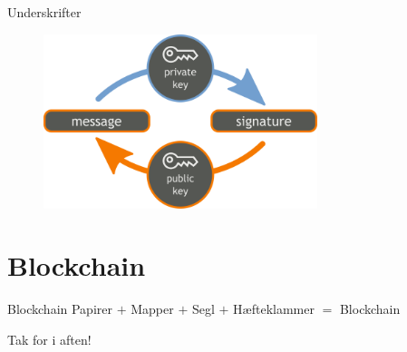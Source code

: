 \documentclass[usenames, dvipsnames]{beamer}
\begin{document}
  \begin{frame}{Underskrifter}
    \begin{figure}[ht!]
    \centering
    \includegraphics[width=80mm]{images/signature.png}
    \end{figure}
  \end{frame}
\section{Blockchain}
  \begin{frame}{Blockchain}
      \center Papirer $+$ Mapper $+$ Segl $+$ Hæfteklammer $=$ Blockchain
  \end{frame}
  \begin{frame}{}
    \center \huge Tak for i aften! \\
  \end{frame}
\end{document}
